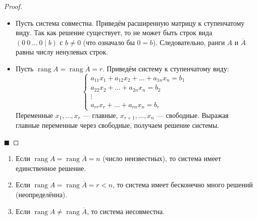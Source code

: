\begin{proof}
\begin{itemize}
    \item[$\Rightarrow$] Пусть система совместна. Приведём расширенную матрицу к ступенчатому виду. Так как решение существует, то не может быть строк вида $(0 \ 0 \ \ldots \ 0 \mid b)$ с $b \neq 0$ (что означало бы $0 = b$). Следовательно, ранги $A$ и $\overline{A}$ равны числу ненулевых строк.
    
    \item[$\Leftarrow$] Пусть $\operatorname{rang} A = \operatorname{rang} \overline{A} = r$. Приведём систему к ступенчатому виду:
    \[
    \begin{cases}
    a_{11}x_1 + a_{12}x_2 + \ldots + a_{1n}x_n = b_1 \\
    a_{22}x_2 + \ldots + a_{2n}x_n = b_2 \\
    \vdots \\
    a_{rr}x_r + \ldots + a_{rn}x_n = b_r
    \end{cases}
    \]
    Переменные $x_1, \ldots, x_r$ --- главные, $x_{r+1}, \ldots, x_n$ --- свободные. Выражая главные переменные через свободные, получаем решение системы.
\end{itemize}
\hfill$\blacksquare$
\end{proof}

\begin{corollary}
\begin{enumerate}
    \item Если $\operatorname{rang} A = \operatorname{rang} \overline{A} = n$ (число неизвестных), то система имеет единственное решение.
    \item Если $\operatorname{rang} A = \operatorname{rang} \overline{A} = r < n$, то система имеет бесконечно много решений (неопределённа).
    \item Если $\operatorname{rang} A \neq \operatorname{rang} \overline{A}$, то система несовместна.
\end{enumerate}
\end{corollary}
